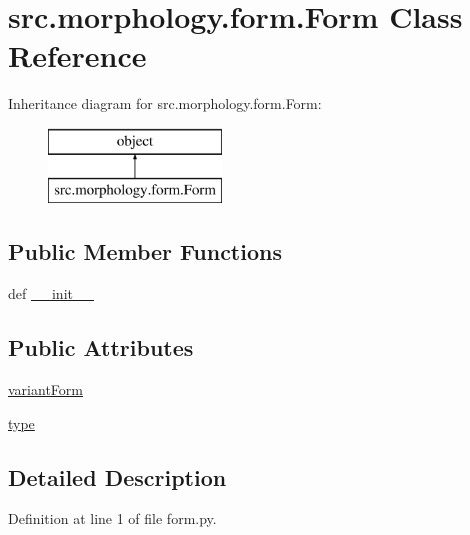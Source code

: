 \hypertarget{classsrc_1_1morphology_1_1form_1_1_form}{\section{src.\+morphology.\+form.\+Form Class Reference}
\label{classsrc_1_1morphology_1_1form_1_1_form}
}
Inheritance diagram for src.\+morphology.\+form.\+Form\+:\begin{figure}[H]
\begin{center}
\leavevmode
\includegraphics[height=2.000000cm]{classsrc_1_1morphology_1_1form_1_1_form}
\end{center}
\end{figure}
\subsection*{Public Member Functions}
\begin{DoxyCompactItemize}
\item 
def \hyperlink{classsrc_1_1morphology_1_1form_1_1_form_a6fc47fee0b76c93cb759b88545ae3722}{\+\_\+\+\_\+init\+\_\+\+\_\+}
\end{DoxyCompactItemize}
\subsection*{Public Attributes}
\begin{DoxyCompactItemize}
\item 
\hyperlink{classsrc_1_1morphology_1_1form_1_1_form_ab6a611d205e76fa8b87def7b2a65d24a}{variant\+Form}
\item 
\hyperlink{classsrc_1_1morphology_1_1form_1_1_form_ac57a7b708122672362f6c1bb972c6c97}{type}
\end{DoxyCompactItemize}


\subsection{Detailed Description}


Definition at line 1 of file form.\+py.



